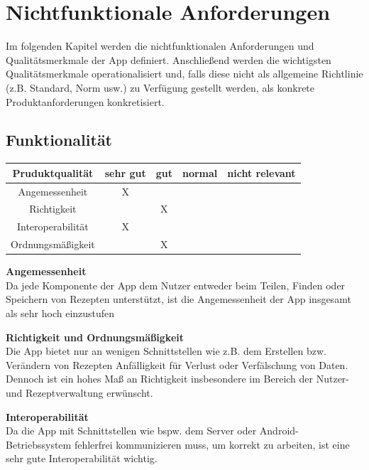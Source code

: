 \documentclass[parskip=full]{scrartcl}
\begin{document}
\section{Nichtfunktionale Anforderungen}
Im folgenden Kapitel werden die nichtfunktionalen Anforderungen und Qualitätsmerkmale der App definiert.
Anschließend werden die wichtigsten Qualitätsmerkmale operationalisiert und, falls diese nicht als allgemeine Richtlinie (z.B. Standard, Norm usw.) zu Verfügung gestellt werden,
als konkrete Produktanforderungen konkretisiert.

\subsection{Funktionalität}
\begin{tabular}{| c | c | c | c | c |}
    \hline
    \textbf{Pruduktqualität} & \textbf{sehr gut} & \textbf{gut} & \textbf{normal} & \textbf{nicht relevant} \\ \hline
    Angemessenheit           & X                 &              &                 &                         \\ \hline
    Richtigkeit              &                   & X            &                 &                         \\ \hline
    Interoperabilität        & X                 &              &                 &                         \\ \hline
    Ordnungsmäßigkeit        &                   & X            &                 &                         \\ \hline
\end{tabular}

\textbf{Angemessenheit}\\
Da jede Komponente der App dem Nutzer entweder beim Teilen, Finden oder Speichern von Rezepten unterstützt, ist die Angemessenheit der App insgesamt als sehr hoch einzustufen

\textbf{Richtigkeit und Ordnungsmäßigkeit}\\
Die App bietet nur an wenigen Schnittstellen wie z.B. dem Erstellen bzw. Verändern von Rezepten Anfälligkeit für Verlust oder Verfälschung von Daten. Dennoch ist ein hohes Maß an Richtigkeit insbesondere im Bereich der Nutzer- und Rezeptverwaltung erwünscht.

\textbf{Interoperabilität}\\
Da die App mit Schnittstellen wie bspw. dem Server oder Android-Betriebssystem fehlerfrei kommunizieren muss, um korrekt zu arbeiten, ist eine sehr gute Interoperabilität wichtig.
\end{document}
